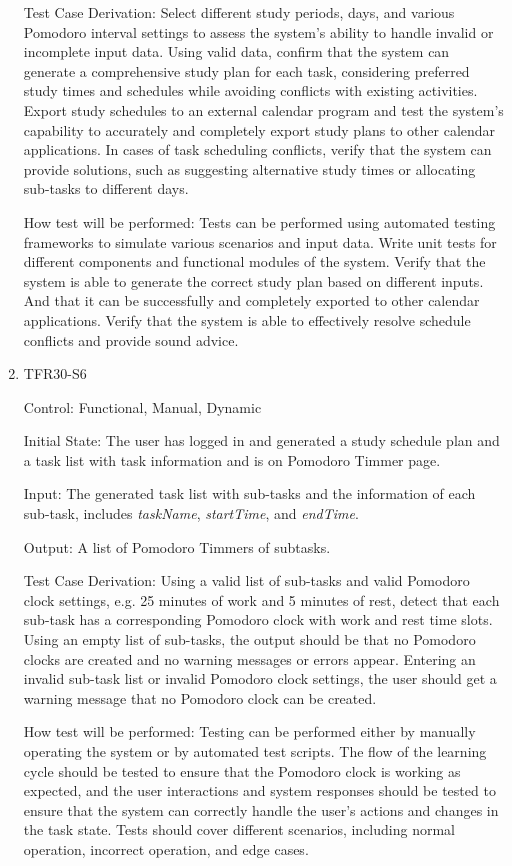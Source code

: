 \documentclass[12pt, titlepage]{article}
\begin{document}
\begin{enumerate}
Test Case Derivation: Select different study periods, days, and various Pomodoro interval settings to assess the system's ability to handle invalid or incomplete input data. Using valid data, confirm that the system can generate a comprehensive study plan for each task, considering preferred study times and schedules while avoiding conflicts with existing activities. Export study schedules to an external calendar program and test the system's capability to accurately and completely export study plans to other calendar applications. In cases of task scheduling conflicts, verify that the system can provide solutions, such as suggesting alternative study times or allocating sub-tasks to different days.

How test will be performed: Tests can be performed using automated testing frameworks to simulate various scenarios and input data. Write unit tests for different components and functional modules of the system. Verify that the system is able to generate the correct study plan based on different inputs. And that it can be successfully and completely exported to other calendar applications. Verify that the system is able to effectively resolve schedule conflicts and provide sound advice.

\item{TFR30-S6\\}

Control: Functional, Manual, Dynamic

Initial State: The user has logged in and generated a study schedule plan and a task list with task information and is on Pomodoro Timmer page.
					
Input: The generated task list with sub-tasks and the information of each sub-task, includes \textit{taskName}, \textit{startTime}, and \textit{endTime}.
					
Output: A list of Pomodoro Timmers of subtasks.

Test Case Derivation: Using a valid list of sub-tasks and valid Pomodoro clock settings, e.g. 25 minutes of work and 5 minutes of rest, detect that each sub-task has a corresponding Pomodoro clock with work and rest time slots. Using an empty list of sub-tasks, the output should be that no Pomodoro clocks are created and no warning messages or errors appear. Entering an invalid sub-task list or invalid Pomodoro clock settings, the user should get a warning message that no Pomodoro clock can be created.
					
How test will be performed: Testing can be performed either by manually operating the system or by automated test scripts. The flow of the learning cycle should be tested to ensure that the Pomodoro clock is working as expected, and the user interactions and system responses should be tested to ensure that the system can correctly handle the user's actions and changes in the task state. Tests should cover different scenarios, including normal operation, incorrect operation, and edge cases.


\end{enumerate}
\end{document}
